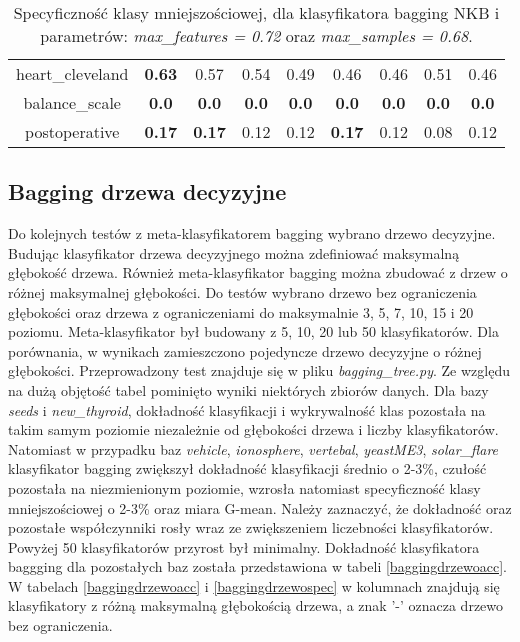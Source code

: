 \begin{table}[H]
\begin{center}
{\begin{tabular}{c|cccccccc}
				heart\_cleveland&\textbf{0.63}&0.57&0.54&0.49&0.46&0.46&0.51&0.46\\%
				balance\_scale&\textbf{0.0}&\textbf{0.0}&\textbf{0.0}&\textbf{0.0}&\textbf{0.0}&\textbf{0.0}&\textbf{0.0}&\textbf{0.0}\\%
				postoperative&\textbf{0.17}&\textbf{0.17}&0.12&0.12&\textbf{0.17}&0.12&0.08&0.12\\%
			\end{tabular}}
			\caption{Specyficzność klasy mniejszościowej, dla klasyfikatora bagging NKB i parametrów: \textit{max\_features = 0.72} oraz \textit{max\_samples = 0.68}.}
			\label{baggin_spec2}
		\end{center}
	\end{table}
\subsection{Bagging drzewa decyzyjne}
Do kolejnych testów z meta-klasyfikatorem bagging wybrano drzewo decyzyjne. Budując klasyfikator drzewa decyzyjnego można zdefiniować maksymalną głębokość drzewa. Również meta-klasyfikator bagging można zbudować z drzew o różnej maksymalnej głębokości. Do testów wybrano drzewo bez ograniczenia głębokości oraz drzewa z ograniczeniami do maksymalnie 3, 5, 7, 10, 15 i 20 poziomu. Meta-klasyfikator był budowany z 5, 10, 20 lub 50 klasyfikatorów. Dla porównania, w wynikach zamieszczono pojedyncze drzewo decyzyjne o różnej głębokości. Przeprowadzony test znajduje się w pliku \textit{bagging\_tree.py}. Ze względu na dużą objętość tabel pominięto wyniki niektórych zbiorów danych. Dla bazy \textit{seeds} i \textit{new\_thyroid}, dokładność klasyfikacji i wykrywalność klas pozostała na takim samym poziomie niezależnie od głębokości drzewa i liczby klasyfikatorów. Natomiast w przypadku baz \textit{vehicle}, \textit{ionosphere}, \textit{vertebal}, \textit{yeastME3}, \textit{solar\_flare} klasyfikator bagging zwiększył dokładność klasyfikacji średnio o 2-3\%, czułość pozostała na niezmienionym poziomie, wzrosła natomiast specyficzność klasy mniejszościowej o 2-3\% oraz miara G-mean. Należy zaznaczyć, że dokładność oraz pozostałe współczynniki rosły wraz ze zwiększeniem liczebności klasyfikatorów. Powyżej 50 klasyfikatorów przyrost był minimalny. Dokładność klasyfikatora baggging dla pozostałych baz została przedstawiona w tabeli \ref{baggingdrzewoacc}. W tabelach \ref{baggingdrzewoacc} i \ref{baggingdrzewospec} w kolumnach znajdują się klasyfikatory z różną maksymalną głębokością drzewa, a znak '-' oznacza drzewo bez ograniczenia. 
